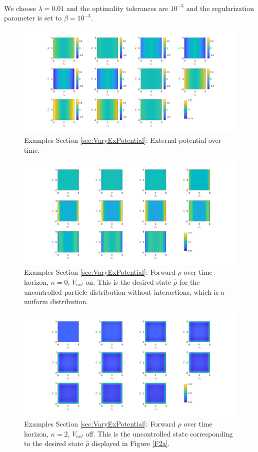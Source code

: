 \documentclass[11pt, a4paper]{article}
\theoremstyle{definition}
\newcommand{\hr}{\widehat \rho}
\begin{document}
\\
We choose $\lambda = 0.01$ and the optimality tolerances are $10^{-3}$ and the regularization parameter is set to $\beta = 10^{-3}$. 
\begin{figure}[h]
	\centering
	\includegraphics[scale=0.35]{Vext.png}
	\caption{Examples Section \ref{sec:VaryExPotential}: External potential over time.} 
	\label{F1}
\end{figure}
\begin{figure}[h]
	\centering
	\includegraphics[scale=0.35]{rhok0V.png}
	\caption{Examples Section \ref{sec:VaryExPotential}: Forward $\rho$ over time horizon, $\kappa = 0$, $V_{ext}$ on. This is the desired state $\hr$ for the uncontrolled particle distribution without interactions, which is a uniform distribution.} 
	\label{F0c}
\end{figure}
\begin{figure}[h]
	\centering
	\includegraphics[scale=0.35]{rhok05.png}
	\caption{Examples Section \ref{sec:VaryExPotential}: Forward $\rho$ over time horizon, $\kappa = 2$, $V_{ext}$ off. This is the uncontrolled state corresponding to the desired state $\hr$ displayed in Figure \ref{F2a}.} 
	\label{F0a}
\end{figure}
\end{document}
